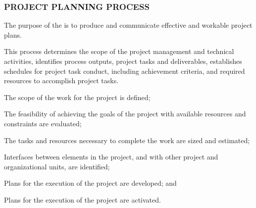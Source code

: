 		\newpage
		\subsubsection{PROJECT PLANNING PROCESS\label{proc:project_planning_process}}

			\begin{adjustwidth}{2em}{0pt}

				The purpose of the  is to produce and communicate effective and workable project plans.

				This process determines the scope of the project management and technical activities, identifies process outputs, project tasks and deliverables, establishes schedules for project task conduct, including achievement criteria, and required resources to accomplish project tasks.

			\end{adjustwidth}

			\begin{adjustwidth}{2em}{0pt}

				\begin{compactitem}
					\item The scope of the work for the project is defined;
					\item The feasibility of achieving the goals of the project with available resources and constraints are evaluated;
					\item The tasks and resources necessary to complete the work are sized and estimated;
					\item Interfaces between elements in the project, and with other project and organizational units, are identified;
					\item Plans for the execution of the project are developed; and
					\item Plans for the execution of the project are activated.
				\end{compactitem}
			
			\end{adjustwidth}

